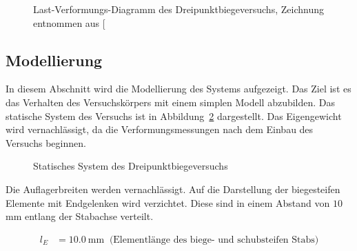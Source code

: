 \documentclass[
  11pt,
  letterpaper,
]{scrreprt}
\begin{document}
\begin{figure}[H]


\caption{\label{fig-last_verformung_a3v2}Last-Verformungs-Diagramm des
Dreipunktbiegeversuchs, Zeichnung entnommen aus
{[}\citeproc{ref-jager_versuche_2006}{2}{]}}

\end{figure}%

\subsection{Modellierung}\label{modellierung}

In diesem Abschnitt wird die Modellierung des Systems aufgezeigt. Das
Ziel ist es das Verhalten des Versuchskörpers mit einem simplen Modell
abzubilden. Das statische System des Versuchs ist in
Abbildung~\ref{fig-system_a3v2} dargestellt. Das Eigengewicht wird
vernachlässigt, da die Verformungsmessungen nach dem Einbau des Versuchs
beginnen.

\begin{figure}[H]


\caption{\label{fig-system_a3v2}Statisches System des
Dreipunktbiegeversuchs}

\end{figure}%

Die Auflagerbreiten werden vernachlässigt. Auf die Darstellung der
biegesteifen Elemente mit Endgelenken wird verzichtet. Diese sind in
einem Abstand von \(10\) mm entlang der Stabachse verteilt.

$$
\begin{aligned}
l_{E} &= 10.0\ \mathrm{mm} \; \;\textrm{(Elementlänge des biege- und schubsteifen Stabs)}
\end{aligned}
$$
\end{document}
